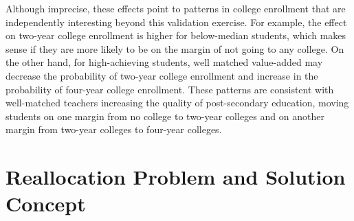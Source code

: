 \documentclass[12pt]{article}
\theoremstyle{definition}
\theoremstyle{definition}
\theoremstyle{definition}
\theoremstyle{definition}
\begin{document}
Although imprecise, these effects point to patterns in college enrollment that are independently interesting beyond this validation exercise. For example, the effect on two-year college enrollment is higher for below-median students, which makes sense if they are more likely to be on the margin of not going to any college. On the other hand, for high-achieving students, well matched value-added may decrease the probability of two-year college enrollment and increase in the probability of four-year college enrollment. These patterns are consistent with well-matched teachers increasing the quality of post-secondary education, moving students on one margin from no college to two-year colleges and on another margin from two-year colleges to four-year colleges.
    


\section{Reallocation Problem and Solution Concept} \label{optimization}


\end{document}
